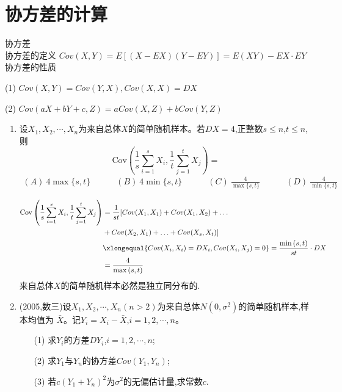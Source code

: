 \documentclass[12pt, a4paper, oneside, UTF8]{ctexbook}
\begin{document}
\section{协方差的计算}
\begin{remark}
    协方差 \\
    协方差的定义 $Cov(X,Y)=E\left[(X-EX)(Y-EY)\right]=E(XY)-EX\cdot EY$ \\
    协方差的性质
    \item[(1)] $Cov(X,Y)=Cov(Y,X),Cov(X,X)=DX$
    \item[(2)] $Cov(aX+bY+c,Z)=aCov(X,Z)+bCov(Y,Z)$ 
\end{remark}
\begin{enumerate}[label=\arabic*.,start=11]
    \item  设$X_1,X_2,\cdots,X_n$为来自总体$X$的简单随机样本。若$DX=4$,正整数$s\leq n$,$t\leq n$,则
    $$
    \text{Cov}\left(\frac{1}{s}\sum_{i=1}^s X_i,\frac{1}{t}\sum_{j=1}^t X_j\right)=
    $$
    \begin{align*}
        (A)\ 4\max\{s,t\} \qquad\quad (B)\ 4\min\{s,t\} \quad\qquad (C)\ \frac{4}{\max\{s,t\}} \quad\qquad (D)\ \frac{4}{\min\{s,t\}}
    \end{align*}

    \begin{solution}
    \begin{align*}
        \text{Cov}\left(\frac{1}{s}\sum_{i=1}^s X_i,\frac{1}{t}\sum_{j=1}^t X_j\right) 
        &= \frac{1}{st}[Cov(X_1,X_1)+Cov(X_1,X_2)+\ldots \\
        &+Cov(X_2,X_1)+\ldots+Cov(X_s,X_t)] \\
        &\xlongequal{Cov(X_i,X_i)=DX_i,Cov(X_i,X_j)=0}=\frac{\min{(s,t)}}{st}\cdot DX \\
        &=\frac{4}{\max{(s,t)}}
    \end{align*}
    来自总体$X$的简单随机样本必然是独立同分布的.
    \end{solution}
    
    \item  (2005,数三)设$X_1,X_2,\cdots,X_n(n>2)$为来自总体$N(0,\sigma^2)$的简单随机样本,样本均值为
    $\bar{X}$。记$Y_i=X_i-\bar{X}$,$i=1,2,\cdots,n$。
    \begin{enumerate}
        \item[(1)] 求$Y_i$的方差$DY_i$,$i=1,2,\cdots,n$;
        \item[(2)] 求$Y_1$与$Y_n$的协方差$Cov(Y_1,Y_n)$; 
        \item[(3)] 若$c(Y_1+Y_n)^2$为$\sigma^2$的无偏估计量,求常数$c$.
    \end{enumerate}
    

\end{enumerate}
\end{document}
